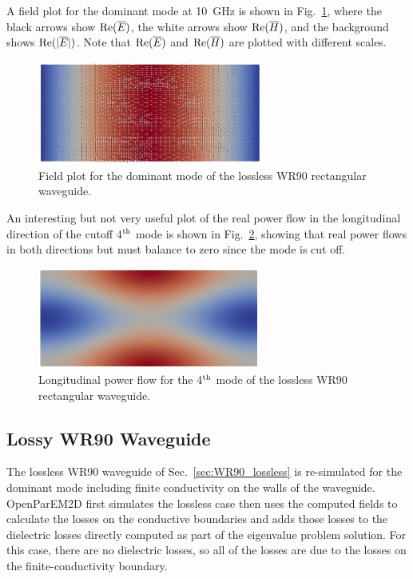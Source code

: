 \documentclass[titlepage]{article}
\renewcommand\_{\textunderscore\linebreak[1]}
\begin{document}
A field plot for the dominant mode at 10~GHz is shown in Fig.~\ref{fig:WR90_mode_1}, where the black arrows show $\textnormal{Re}(\overline{E})$, the white arrows show $\textnormal{Re}(\overline{H})$, and the background shows $\textnormal{Re}(|\overline{E}|)$.  Note that $\textnormal{Re}(\overline{E})$ and $\textnormal{Re}(\overline{H})$ are plotted with different scales.
\begin{figure}[H]
  \centering
  \includegraphics[width=0.66\textwidth]{../regression/OpenParEM2D/WR90_rectangular_waveguide/WR90/WR90_order_6_study/screenshots/WR90_mode_1}
  \caption{Field plot for the dominant mode of the lossless WR90 rectangular waveguide.}
  \label{fig:WR90_mode_1}
\end{figure}
An interesting but not very useful plot of the real power flow in the longitudinal direction of the cutoff 4$^{\textnormal{th}}$ mode is shown in Fig.~\ref{fig:WR90_mode_4_Pz}, showing that real power flows in both directions but must balance to zero since the mode is cut off.
\begin{figure}[H]
  \centering
  \includegraphics[width=0.65\textwidth]{../regression/OpenParEM2D/WR90_rectangular_waveguide/WR90/WR90_order_6_study/screenshots/WR90_mode_4_Pz}
  \caption{Longitudinal power flow for the 4$^{\textnormal{th}}$ mode of the lossless WR90 rectangular waveguide.}
  \label{fig:WR90_mode_4_Pz}
\end{figure}

\subsection{Lossy WR90 Waveguide}

The lossless WR90 waveguide of Sec.~\ref{sec:WR90_lossless} is re-simulated for the dominant mode including finite conductivity on the walls of the waveguide.  OpenParEM2D first simulates the lossless case then uses the computed fields to calculate the losses on the conductive boundaries and adds those losses to the dielectric losses directly computed as part of the eigenvalue problem solution.  For this case, there are no dielectric losses, so all of the losses are due to the losses on the finite-conductivity boundary.
\end{document}
